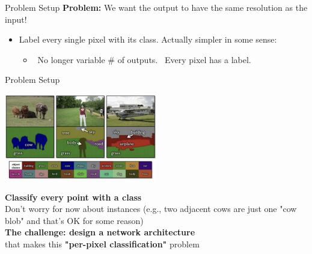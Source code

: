 \documentclass[serif, aspectratio=169]{beamer}
\begin{document}
\begin{frame}{Problem Setup}
     \textbf{\textcolor{deepred}{Problem:}} \textcolor{deepred}{We want the output to have the same resolution as the input!}
    \begin{itemize}
        \item Label every single pixel with its class. Actually simpler in some sense:
        \begin{itemize}
            \item[] \textbullet \ No longer variable \# of outputs. \hspace{1em}\textbullet \ Every pixel has a label.
        \end{itemize}
    \end{itemize}

\end{frame}


\begin{frame}{Problem Setup}
    \begin{center}
        \includegraphics[width=0.5\textwidth]{pic/SS problem setup now2.png}
    \end{center}
    
    
    \begin{minipage}{0.9\textwidth}\footnotesize
        \textbf{Classify every point with a class} \\
        Don't worry for now about instances (e.g., two adjacent cows are just one "cow blob" and that’s OK for some reason)\\

                
        \textbf{The challenge: design a network architecture} \\
        that makes this \textbf{"per-pixel classification"} problem  \color{deepblue}{computationally tractable}
    \end{minipage}
\end{frame}
\end{document}
